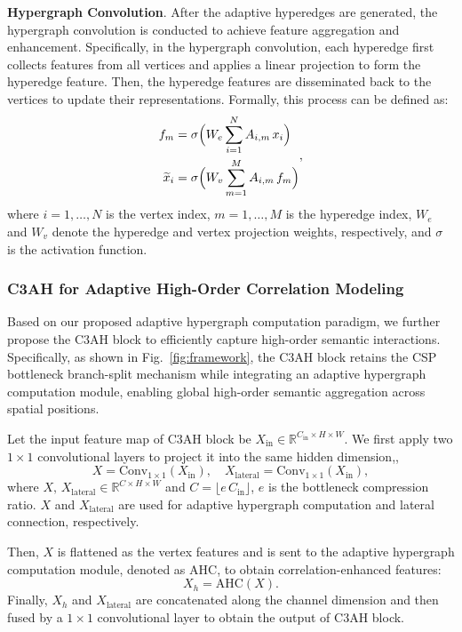 \textbf{Hypergraph Convolution}.
After the adaptive hyperedges are generated, the hypergraph convolution is conducted to achieve feature aggregation and enhancement. Specifically, in the hypergraph convolution, each hyperedge first collects features from all vertices and applies a linear projection to form the hyperedge feature. Then, the hyperedge features are disseminated back to the vertices to update their representations. Formally, this process can be defined as:
\begin{equation}
    \begin{aligned}
        f_{m} &= \sigma\Bigl(W_{e}\sum_{i=1}^{N} A_{i,m}\,x_{i}\Bigr)\\
        \widetilde x_{i} &= \sigma\Bigl(W_{v}\sum_{m=1}^{M} A_{i,m}\,f_{m}\Bigr)
    \end{aligned},
\end{equation}
where $i=1,\dots,N$ is the vertex index, $m=1,\dots,M$ is the hyperedge index, $W_{e}$ and $W_{v}$ denote the hyperedge and vertex projection weights, respectively, and $\sigma$ is the activation function.

\subsubsection{C3AH for Adaptive High-Order Correlation Modeling}
Based on our proposed adaptive hypergraph computation paradigm, we further propose the C3AH block to efficiently capture high-order semantic interactions. Specifically, as shown in Fig.~\ref{fig:framework}, the C3AH block retains the CSP bottleneck branch-split mechanism while integrating an adaptive hypergraph computation module, enabling global high-order semantic aggregation across spatial positions.

Let the input feature map of C3AH block be $X_{\mathrm{in}}\in\mathbb{R}^{C_{\mathrm{in}}\times H\times W}$. We first apply two $1\times1$ convolutional layers to project it into the same hidden dimension,\ie,
\begin{equation}
    X = \text{Conv}_{1\times1}(X_{\text{in}}),\quad
X_{\text{lateral}} = \text{Conv}_{1\times1}(X_{\text{in}}),
\end{equation}
where $X,\,X_{\mathrm{lateral}}\in\mathbb{R}^{C\times H\times W}$ and $C=\lfloor e\,C_{\mathrm{in}}\rfloor$, $e$ is the bottleneck compression ratio. $X$ and $X_{\text{lateral}}$ are used for adaptive hypergraph computation and lateral connection, respectively.

Then, $X$ is flattened as the vertex features and is sent to the adaptive hypergraph computation module, denoted as AHC, to obtain correlation-enhanced features:
\begin{equation}
    X_{h} = \mathrm{AHC}(X).
\end{equation}
Finally, $X_{h}$ and $X_{\mathrm{lateral}}$ are concatenated along the channel dimension and then fused by a $1\times1$ convolutional layer to obtain the output of C3AH block.

